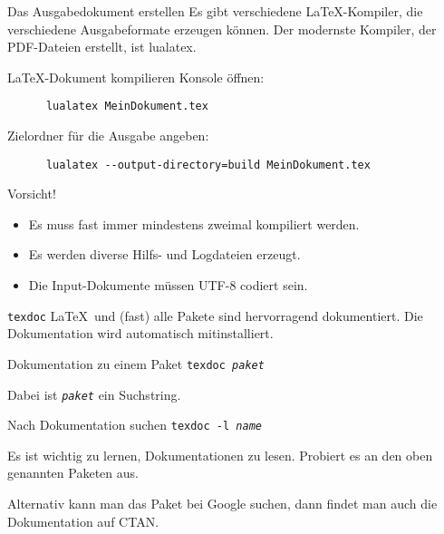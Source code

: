 \begin{frame}[fragile]{Das Ausgabedokument erstellen}
  Es gibt verschiedene \LaTeX-Kompiler, die verschiedene Ausgabeformate erzeugen können.
  Der modernste Kompiler, der PDF-Dateien erstellt, ist \alert{lualatex}.

  \begin{block}{\LaTeX-Dokument kompilieren}
    Konsole öffnen:
    \begin{lstlisting}
      lualatex MeinDokument.tex
    \end{lstlisting}
  \end{block}
  \begin{block}{Zielordner für die Ausgabe angeben:}
    \begin{lstlisting}
      lualatex --output-directory=build MeinDokument.tex
    \end{lstlisting}
  \end{block}
  \begin{alertblock}{Vorsicht!}
    \begin{itemize}
      \item Es muss fast immer mindestens zweimal kompiliert werden.
      \item Es werden diverse Hilfs- und Logdateien erzeugt.
      \item Die Input-Dokumente müssen UTF-8 codiert sein.
    \end{itemize}
  \end{alertblock}
\end{frame}

\begin{frame}{\texttt{texdoc}}
  \LaTeX\ und (fast) alle Pakete sind hervorragend dokumentiert. Die Dokumentation wird automatisch mitinstalliert.
  \begin{block}{Dokumentation zu einem Paket}
    \texttt{texdoc \textit{paket}}
  \end{block}

  Dabei ist \texttt{\textit{paket}} ein Suchstring.
  \begin{block}{Nach Dokumentation suchen}
    \texttt{texdoc -l \textit{name}}
  \end{block}

  Es ist wichtig zu lernen, Dokumentationen zu lesen. Probiert es an den oben genannten Paketen aus.

  \vspace{10pt}
  Alternativ kann man das Paket bei Google suchen, dann findet man auch die Dokumentation auf CTAN.
\end{frame}
